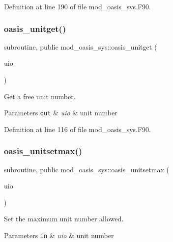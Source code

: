Definition at line 190 of file mod\+\_\+oasis\+\_\+sys.\+F90.

\mbox{\label{namespacemod__oasis__sys_abce4c06d8a999919a2a185c71ab15edd}} 
\subsubsection{\texorpdfstring{oasis\+\_\+unitget()}{oasis\_unitget()}}
{\footnotesize\ttfamily subroutine, public mod\+\_\+oasis\+\_\+sys\+::oasis\+\_\+unitget (\begin{DoxyParamCaption}\item[{integer(kind=ip\+\_\+intwp\+\_\+p), intent(out)}]{uio }\end{DoxyParamCaption})}



Get a free unit number. 


\begin{DoxyParams}[1]{Parameters}
\mbox{\tt out}  & {\em uio} & unit number \\
\hline
\end{DoxyParams}


Definition at line 116 of file mod\+\_\+oasis\+\_\+sys.\+F90.

\mbox{\label{namespacemod__oasis__sys_a6e0a46b41f1b9f0a1dc99b17665f49dc}} 
\subsubsection{\texorpdfstring{oasis\+\_\+unitsetmax()}{oasis\_unitsetmax()}}
{\footnotesize\ttfamily subroutine, public mod\+\_\+oasis\+\_\+sys\+::oasis\+\_\+unitsetmax (\begin{DoxyParamCaption}\item[{integer(kind=ip\+\_\+intwp\+\_\+p), intent(in)}]{uio }\end{DoxyParamCaption})}



Set the maximum unit number allowed. 


\begin{DoxyParams}[1]{Parameters}
\mbox{\tt in}  & {\em uio} & unit number \\
\hline
\end{DoxyParams}


